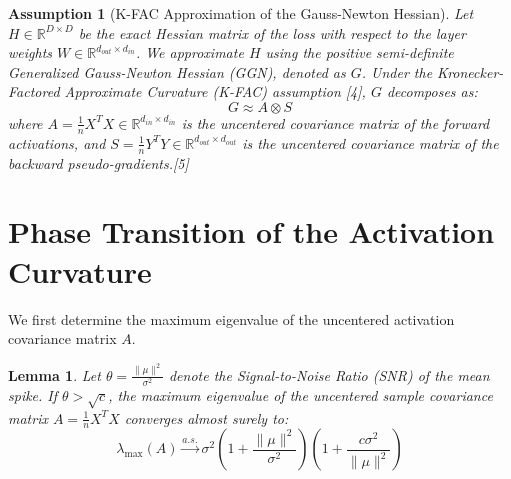 \documentclass[11pt, a4paper]{article}
\newtheorem{lemma}{Lemma}
\newtheorem{assumption}{Assumption}
\begin{document}
\begin{assumption}[K-FAC Approximation of the Gauss-Newton Hessian]
Let $H \in \mathbb{R}^{D \times D}$ be the exact Hessian matrix of the loss with respect to the layer weights $W \in \mathbb{R}^{d_{out} \times d_{in}}$. We approximate $H$ using the positive semi-definite Generalized Gauss-Newton Hessian (GGN), denoted as $G$. Under the Kronecker-Factored Approximate Curvature (K-FAC) assumption [4], $G$ decomposes as:
\begin{equation}
    G \approx A \otimes S
\end{equation}
where $A = \frac{1}{n} X^T X \in \mathbb{R}^{d_{in} \times d_{in}}$ is the uncentered covariance matrix of the forward activations, and $S = \frac{1}{n} Y^T Y \in \mathbb{R}^{d_{out} \times d_{out}}$ is the uncentered covariance matrix of the backward pseudo-gradients.[5]
\end{assumption}

\section{Phase Transition of the Activation Curvature}

We first determine the maximum eigenvalue of the uncentered activation covariance matrix $A$.

\begin{lemma} \label{lemma:bbp}
Let $\theta = \frac{\|\mu\|^2}{\sigma^2}$ denote the Signal-to-Noise Ratio (SNR) of the mean spike. If $\theta > \sqrt{c}$, the maximum eigenvalue of the uncentered sample covariance matrix $A = \frac{1}{n} X^T X$ converges almost surely to:
\begin{equation}
    \lambda_{\max}(A) \xrightarrow{a.s.} \sigma^2 \left( 1 + \frac{\|\mu\|^2}{\sigma^2} \right) \left( 1 + \frac{c \sigma^2}{\|\mu\|^2} \right)
\end{equation}
\end{lemma}
\end{document}
